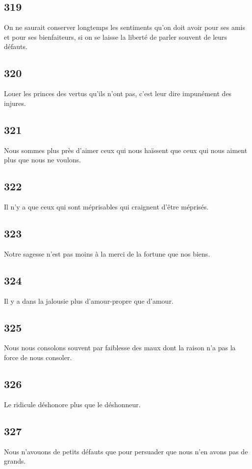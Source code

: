 \documentclass[french,twoside]{book} %
\begin{document}
\subsection[{319}]{ \textsc{319} }
\noindent On ne saurait conserver longtemps les sentiments qu’on doit avoir pour ses amis et pour ses bienfaiteurs, si on se laisse la liberté de parler souvent de leurs défauts.
\subsection[{320}]{ \textsc{320} }
\noindent Louer les princes des vertus qu’ils n’ont pas, c’est leur dire impunément des injures.
\subsection[{321}]{ \textsc{321} }
\noindent Nous sommes plus près d’aimer ceux qui nous haïssent que ceux qui nous aiment plus que nous ne voulons.
\subsection[{322}]{ \textsc{322} }
\noindent Il n’y a que ceux qui sont méprisables qui craignent d’être méprisés.
\subsection[{323}]{ \textsc{323} }
\noindent Notre sagesse n’est pas moins à la merci de la fortune que nos biens.
\subsection[{324}]{ \textsc{324} }
\noindent Il y a dans la jalousie plus d’amour-propre que d’amour.
\subsection[{325}]{ \textsc{325} }
\noindent Nous nous consolons souvent par faiblesse des maux dont la raison n’a pas la force de nous consoler.
\subsection[{326}]{ \textsc{326} }
\noindent Le ridicule déshonore plus que le déshonneur.
\subsection[{327}]{ \textsc{327} }
\noindent Nous n’avouons de petits défauts que pour persuader que nous n’en avons pas de grands.
\end{document}
